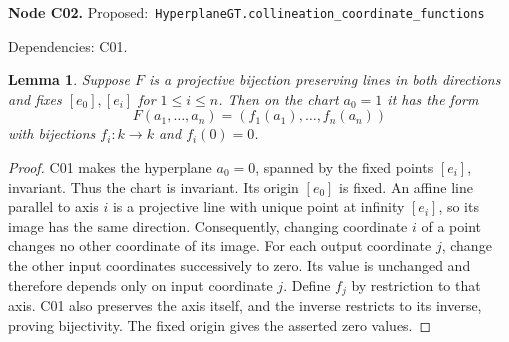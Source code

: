 \documentclass[11pt]{article}
\newtheorem{lemma}[theorem]{Lemma}
\theoremstyle{remark}\newtheorem{remark}[theorem]{Remark}
\newcommand{\code}[1]{\nolinkurl{#1}}
\newcommand{\node}[3]{\par\Needspace{8\baselineskip}\smallskip\noindent\textbf{Node #1.}\quad
 \textsf{Proposed:}\ \code{#2}\par\noindent
 \textsf{Dependencies:} #3.\par\smallskip}
\begin{document}
\node{C02}{HyperplaneGT.collineation_coordinate_functions}{C01}
\begin{lemma}\label{lem:c02}
Suppose $F$ is a projective bijection preserving lines in both
directions and fixes $[e_0],[e_i]$ for
$1\le i\le n$. Then on the chart $a_0=1$ it has the form
\[
 F(a_1,\ldots,a_n)=(f_1(a_1),\ldots,f_n(a_n))
\]
with bijections $f_i:k\to k$ and $f_i(0)=0$.
\end{lemma}
\begin{proof}
C01 makes the hyperplane $a_0=0$, spanned by the fixed points
$[e_i]$, invariant. Thus the chart is invariant. Its origin
$[e_0]$ is fixed. An affine line parallel to axis $i$ is a
projective line with unique point at infinity $[e_i]$, so its
image has the same direction. Consequently, changing coordinate
$i$ of a point changes no other coordinate of its image.
For each output coordinate $j$, change the other input
coordinates successively to zero. Its value is unchanged and
therefore depends only on input coordinate $j$. Define $f_j$ by
restriction to that axis. C01 also preserves the axis itself,
and the inverse restricts to its inverse, proving bijectivity.
The fixed origin gives the asserted zero values.
\end{proof}
\end{document}
